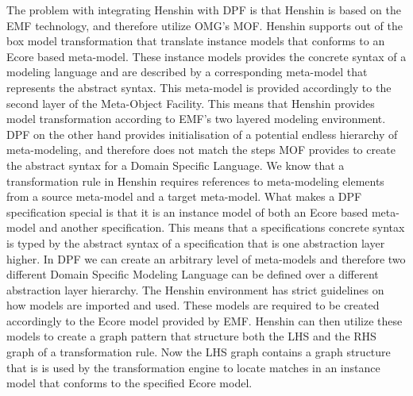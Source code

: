 The problem with integrating Henshin with DPF is that Henshin is based on the
EMF technology, and therefore utilize OMG's MOF. Henshin supports out of the
box model transformation that translate instance models that conforms to an
Ecore based meta-model. These instance models provides the concrete syntax of a
modeling language and are described by a corresponding meta-model that
represents the abstract syntax. This meta-model is provided accordingly to the
second layer of the Meta-Object Facility. This means that Henshin provides model
transformation according to EMF's two layered modeling environment. DPF on the
other hand provides initialisation of a potential endless hierarchy of
meta-modeling, and therefore does not match the steps MOF provides to create
the abstract syntax for a Domain Specific Language. We know that a
transformation rule in Henshin requires references to meta-modeling elements
from a source meta-model and a target meta-model. What makes a DPF
specification special is that it is an instance model of both an Ecore based
meta-model and another specification. This means that a specifications concrete
syntax is typed by the abstract syntax of a specification that is one
abstraction layer higher. In DPF we can create an arbitrary level of
meta-models and therefore two different Domain Specific Modeling Language can
be defined over a different abstraction layer hierarchy. The Henshin
environment has strict guidelines on how models are imported and used. These
models are required to be created accordingly to the Ecore model provided by
EMF. Henshin can then utilize these models to create a graph pattern that
structure both the LHS and the RHS graph of a transformation rule. Now the LHS
graph contains a graph structure that is is used by the transformation engine
to locate matches in an instance model that conforms to the specified Ecore
model.

